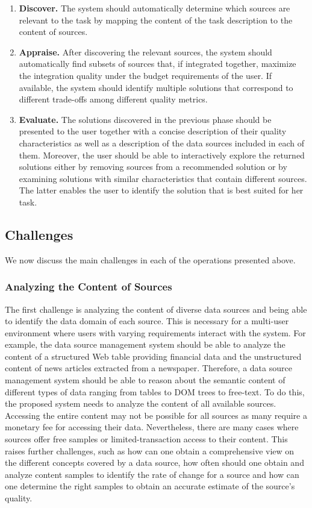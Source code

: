 \documentclass{sig-alternate}
\begin{document}
\begin{enumerate}
\item {\bf Discover.} The system should automatically determine which sources are relevant to the task by mapping the content of the task description to the content of sources.
\item {\bf Appraise.} After discovering the relevant sources, the system should automatically find subsets of sources that, if integrated together, maximize the integration quality under the budget requirements of the user. If available, the system should identify multiple solutions that correspond to different trade-offs among different quality metrics. 
\item {\bf Evaluate.} The solutions discovered in the previous phase should be presented to the user together with a concise description of their quality characteristics as well as a description of the data sources included in each of them. Moreover, the user should be able to interactively explore the returned solutions either by removing sources from a recommended solution or by examining solutions with similar characteristics that contain different sources. The latter enables the user to identify the solution that is best suited for her task.
\end{enumerate}

\subsection{Challenges}
We now discuss the main challenges in each of the operations presented above. 
\subsubsection{Analyzing the Content of Sources}
\label{sec:content}
The first challenge is analyzing the content of diverse data sources and being able to identify the data domain of each source. This is necessary for a multi-user environment where users with varying requirements interact with the system. For example, the data source management system should be able to analyze the content of a structured Web table providing financial data and the unstructured content of news articles extracted from a newspaper. Therefore, a data source management system should be able to reason about the semantic content of different types of data ranging from tables to DOM trees to free-text. To do this, the proposed system needs to analyze the content of all available sources. Accessing the entire content may not be possible for all sources as many require a monetary fee for accessing their data. Nevertheless, there are many cases where sources offer free samples or limited-transaction access to their content. This raises further challenges, such as how can one obtain a comprehensive view on the different concepts covered by a data source, how often should one obtain and analyze content samples to identify the rate of change for a source and how can one determine the right samples to obtain an accurate estimate of the source's quality.
\end{document}
